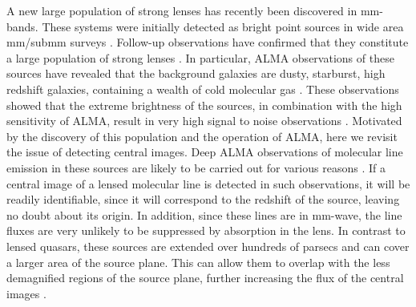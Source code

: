 \documentclass[chicago]{emulateapj}
\begin{document}


A new large population of strong lenses has recently been discovered in mm-bands. These systems were initially detected as bright point sources in wide area mm/submm surveys \citep{vieira:10,negrello:10}. Follow-up observations have confirmed that they constitute a large population of strong lenses \citep{vieira:13, hezaveh:13b, bussmann:13}.
In particular, ALMA observations of these sources have revealed that the background galaxies are dusty, starburst, high redshift galaxies, containing a wealth of cold molecular gas \citep{Weiss:13}.  These observations showed that the extreme brightness of the sources, in combination with the high sensitivity of ALMA, result in very high signal to noise observations \citep[e.g., the lens models in][were based on just $\sim50$ second long observations]{hezaveh:13b}.
Motivated by the discovery of this population and the operation of ALMA, here we revisit the issue of detecting central images.
Deep ALMA observations of molecular line emission in these sources are likely to be carried out for various reasons \citep[e.g.,][]{hezaveh:14a,hezaveh:14b}. If a central image of a lensed molecular line is detected in such observations, it will be readily identifiable, since it will correspond to the redshift of the source, leaving no doubt about its origin. In addition, since these lines are in mm-wave, the line fluxes are very unlikely to be suppressed by absorption in the lens. 
In contrast to lensed quasars, these sources are extended over hundreds of parsecs and can cover a larger area of the source plane. This can allow them to overlap with the less demagnified regions of the source plane, further increasing the flux of the central images \citep[analogous to magnification damping of highly magnified images due to finite source effects, see e.g.,][]{hezaveh:11}.
\end{document}
